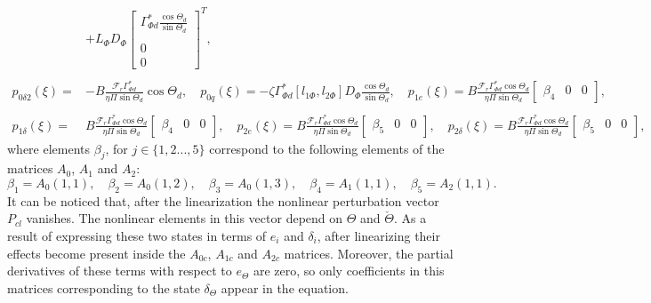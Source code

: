 \documentclass[../main.tex]{subfiles}
\begin{document}
\begin{align}
		&+ L_\Phi D_\Phi\begin{bmatrix}\Gamma_{\Phi d}^*\frac{\cos \Theta_d}{\sin \Theta_d} \\\\0\\0\end{bmatrix}^T, \nonumber	\\
		\nonumber \\
		p_{0\delta 2}(\xi) =& -B\frac{\mathcal{F}_r \Gamma_{\Phi d}^*}{\eta \Pi \sin \Theta_d}\cos \Theta_d, \quad
		p_{0q}(\xi)= -\zeta \Gamma_{\Phi d}^* [l_{1\Phi},l_{2\Phi}]D_\Phi\frac{\cos \Theta_d}{\sin \Theta_d}, \quad p_{1e}(\xi) = B\frac{\mathcal{F}_r \Gamma_{\Phi d}^* \cos \Theta_d}{\eta \Pi \sin \Theta_d}\begin{bmatrix}\beta_4 & 0 & 0\end{bmatrix}, \nonumber \\
		\nonumber \\
		p_{1\delta}(\xi) =& B\frac{\mathcal{F}_r \Gamma_{\Phi d}^* \cos \Theta_d}{\eta \Pi \sin \Theta_d}\begin{bmatrix}\beta_4& 0 & 0\end{bmatrix}, \quad p_{2e}(\xi) = B\frac{\mathcal{F}_r \Gamma_{\Phi d}^* \cos \Theta_d}{\eta \Pi \sin \Theta_d}\begin{bmatrix}\beta_5& 0 & 0\end{bmatrix}, \quad p_{2\delta}(\xi) = B\frac{\mathcal{F}_r \Gamma_{\Phi d}^* \cos \Theta_d}{\eta \Pi \sin \Theta_d}\begin{bmatrix}\beta_5& 0 & 0\end{bmatrix}, \nonumber 		
	\end{align}
	where elements $\beta_j$, for $j \in \{1,2...,5\}$ correspond to the following elements of the matrices $A_0$, $A_1$ and $A_2$:
	\begin{equation}
		\beta_1 = A_0(1,1), \quad \beta_2 = A_0(1,2), \quad \beta_3 = A_0(1,3), \quad \beta_4 = A_1(1,1), \quad \beta_5 = A_2(1,1). \label{eq:coefficientsA}
	\end{equation}
	It can be noticed that, after the linearization the nonlinear perturbation vector $P_{cl}$ vanishes. The nonlinear elements in this vector depend on $\Theta$ and $\check{\Theta}$. As a result of expressing these two states in terms of $e_i$ and $\delta_i$, after linearizing their effects become present inside the $A_{0c}$, $A_{1c}$ and $A_{2c}$ matrices. Moreover, the partial derivatives of these terms with respect to $e_\Theta$ are zero, so only coefficients in this matrices corresponding to the state $\delta_\Theta$ appear in the equation.
	\newpage
	
\end{document}
